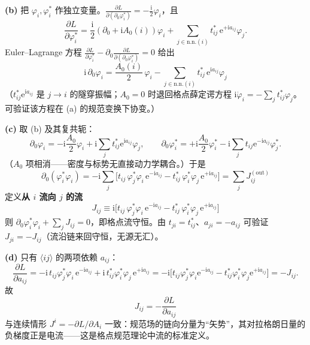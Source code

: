 \textbf{(b)} 把 $\varphi_i,\varphi_i^{*}$ 作独立变量。$\frac{\partial L}{\partial(\partial_0\varphi_i^{*})}=-\frac{\mathrm{i}}{2}\varphi_i$，且
\begin{equation*}
\frac{\partial L}{\partial\varphi_i^{*}}
=\frac{\mathrm{i}}{2}(\partial_0+\mathrm{i}A_0(i))\varphi_i
+\sum_{j\in\mathrm{n.n.}(i)}t_{ij}^{*}\,\mathrm{e}^{+\mathrm{i}a_{ij}}\varphi_j .
\end{equation*}
Euler--Lagrange 方程 $\frac{\partial L}{\partial\varphi_i^{*}}-\partial_0\frac{\partial L}{\partial(\partial_0\varphi_i^{*})}=0$ 给出
\begin{equation*}
\boxed{\;\mathrm{i}\,\partial_0\varphi_i=\frac{A_0(i)}{2}\,\varphi_i
-\sum_{j\in\mathrm{n.n.}(i)}t_{ij}^{*}\,\mathrm{e}^{\mathrm{i}a_{ij}}\varphi_j\;}
\end{equation*}
（$t_{ij}^{*}\mathrm{e}^{\mathrm{i}a_{ij}}$ 是 $j\to i$ 的隧穿振幅；$A_0=0$ 时退回格点薛定谔方程 $\mathrm{i}\dot\varphi_i=-\sum_jt_{ij}^{*}\varphi_j$。可验证该方程在 (a) 的规范变换下协变。）

\textbf{(c)} 取 (b) 及其复共轭：
\begin{equation*}
\partial_0\varphi_i=-\mathrm{i}\frac{A_0}{2}\varphi_i+\mathrm{i}\sum_jt_{ij}^{*}\mathrm{e}^{\mathrm{i}a_{ij}}\varphi_j,
\qquad
\partial_0\varphi_i^{*}=+\mathrm{i}\frac{A_0}{2}\varphi_i^{*}-\mathrm{i}\sum_jt_{ij}\mathrm{e}^{-\mathrm{i}a_{ij}}\varphi_j^{*} .
\end{equation*}
（$A_0$ 项相消——密度与标势无直接动力学耦合。）于是
\begin{equation*}
\partial_0(\varphi_i^{*}\varphi_i)
=-\mathrm{i}\sum_j\Big[t_{ij}\,\varphi_j^{*}\varphi_i\,\mathrm{e}^{-\mathrm{i}a_{ij}}
-t_{ij}^{*}\,\varphi_i^{*}\varphi_j\,\mathrm{e}^{+\mathrm{i}a_{ij}}\Big]
=\sum_j J_{ij}^{(\mathrm{out})}
\end{equation*}
定义\textbf{从 $i$ 流向 $j$ 的流}
\begin{equation*}
\boxed{\;J_{ij}\equiv\mathrm{i}\Big[t_{ij}\,\varphi_j^{*}\varphi_i\,\mathrm{e}^{-\mathrm{i}a_{ij}}
-t_{ij}^{*}\,\varphi_i^{*}\varphi_j\,\mathrm{e}^{+\mathrm{i}a_{ij}}\Big]\;}
\end{equation*}
则 $\partial_0\varphi_i^{*}\varphi_i+\sum_jJ_{ij}=0$，即格点流守恒。由 $t_{ji}=t_{ij}^{*}$、$a_{ji}=-a_{ij}$ 可验证 $J_{ji}=-J_{ij}$（流沿链来回守恒，无源无汇）。

\textbf{(d)} 只有 $\langle ij\rangle$ 的两项依赖 $a_{ij}$：
\begin{equation*}
\frac{\partial L}{\partial a_{ij}}
=-\mathrm{i}\,t_{ij}\varphi_j^{*}\varphi_i\,\mathrm{e}^{-\mathrm{i}a_{ij}}
+\mathrm{i}\,t_{ij}^{*}\varphi_i^{*}\varphi_j\,\mathrm{e}^{+\mathrm{i}a_{ij}}
=-\mathrm{i}\Big[t_{ij}\varphi_j^{*}\varphi_i\mathrm{e}^{-\mathrm{i}a_{ij}}-t_{ij}^{*}\varphi_i^{*}\varphi_j\mathrm{e}^{+\mathrm{i}a_{ij}}\Big]
=-J_{ij} .
\end{equation*}
故
\begin{equation*}
\boxed{\;J_{ij}=-\frac{\partial L}{\partial a_{ij}}\;}
\end{equation*}
与连续情形 $J^i=-\partial L/\partial A_i$ 一致：规范场的链向分量为“矢势”，其对拉格朗日量的负梯度正是电流——这是格点规范理论中流的标准定义。

